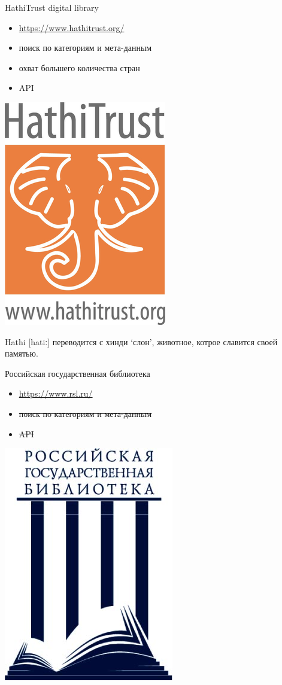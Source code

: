 \documentclass[13pt, t]{beamer}
\begin{document}
\begin{frame}{HathiTrust digital library}
\begin{itemize}
\item \href{https://www.hathitrust.org/}{\alert {https://www.hathitrust.org/}}
\item поиск по категориям и мета-данным
\item охват большего количества стран
\item API
\end{itemize}
\vfill
\begin{center}
\includegraphics[width=0.25\linewidth]{images/04-hathiTrust.png}
\end{center}
\pause
Hathi [hatiː] переводится с хинди `слон', животное, котрое славится своей памятью.
\end{frame}

\begin{frame}{Российская государственная библиотека}
\begin{itemize}
\item \href{https://www.rsl.ru/}{\alert {https://www.rsl.ru/}}
\item  \sout{поиск по категориям и мета-данным}
\item  \sout{API}
\end{itemize}
\vfill
\begin{center}
\includegraphics[width=0.25\linewidth]{images/05-rsl.jpeg}
\end{center}
\end{frame}
\end{document}
